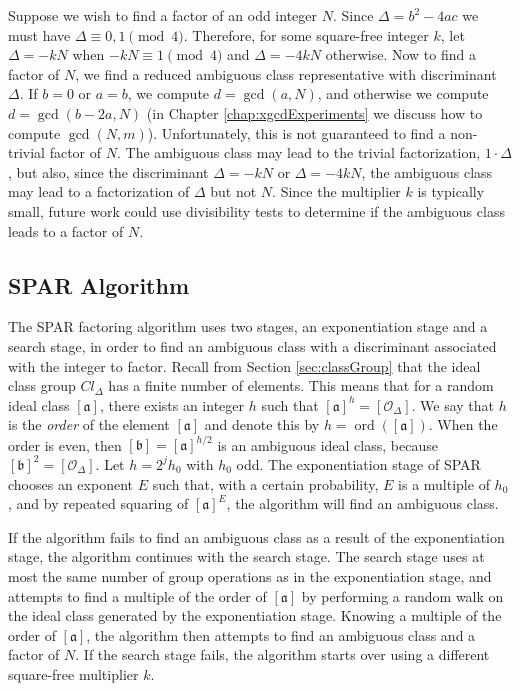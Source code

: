 \documentclass{ucalgthes1}
\theoremstyle{definition}
\DeclareMathOperator{\ord}{ord}
\newcommand{\ideal}{\mathfrak}
\newcommand{\idealclass}[1]{\left[ \ideal #1 \right]}
\newcommand{\aclass}{\idealclass a}
\newcommand{\bclass}{\idealclass b}
\newcommand{\idclass}{[\mathcal O_\Delta]}
\begin{document}
Suppose we wish to find a factor of an odd integer $N$.  Since $\Delta = b^2 - 4ac$ we must have $\Delta \equiv 0, 1 \pmod 4$.  Therefore, for some square-free integer $k$, let $\Delta = -kN$ when $-kN \equiv 1 \pmod 4$ and $\Delta = -4kN$ otherwise.  Now to find a factor of $N$, we find a reduced ambiguous class representative with discriminant $\Delta$.  If $b = 0$ or $a = b$, we compute $d = \gcd(a, N)$, and otherwise we compute $d = \gcd(b-2a, N)$ (in Chapter \ref{chap:xgcdExperiments} we discuss how to compute $\gcd(N, m)$).  Unfortunately, this is not guaranteed to find a non-trivial factor of $N$.  The ambiguous class may lead to the trivial factorization, $1 \cdot \Delta$, but also, since the discriminant $\Delta = -kN$ or $\Delta = -4kN$, the ambiguous class may lead to a factorization of $\Delta$ but not $N$.  Since the multiplier $k$ is typically small, future work could use divisibility tests to determine if the ambiguous class leads to a factor of $N$.


\subsection{SPAR Algorithm}
\label{subsec:sparAlg}

The SPAR factoring algorithm uses two stages, an exponentiation stage and a search stage, in order to find an ambiguous class with a discriminant associated with the integer to factor.  Recall from Section \ref{sec:classGroup} that the ideal class group $Cl_\Delta$ has a finite number of elements.  This means that for a random ideal class $\aclass$, there exists an integer $h$ such that $\aclass^h = \idclass$. We say that $h$ is the \emph{order} of the element $\aclass$ and denote this by $h = \ord(\aclass)$.  When the order is even, then $\bclass = \aclass^{h/2}$ is an ambiguous ideal class, because $\bclass^2 = \idclass$.  Let $h = 2^j h_0$ with $h_0$ odd.  The exponentiation stage of SPAR chooses an exponent $E$ such that, with a certain probability, $E$ is a multiple of $h_0$, and by repeated squaring of $\aclass^E$, the algorithm will find an ambiguous class.

If the algorithm fails to find an ambiguous class as a result of the exponentiation stage, the algorithm continues with the search stage.  The search stage uses at most the same number of group operations as in the exponentiation stage, and attempts to find a multiple of the order of $\aclass$ by performing a random walk on the ideal class generated by the exponentiation stage.  Knowing a multiple of the order of $\aclass$, the algorithm then attempts to find an ambiguous class and a factor of $N$.  If the search stage fails, the algorithm starts over using a different square-free multiplier $k$.
\end{document}
